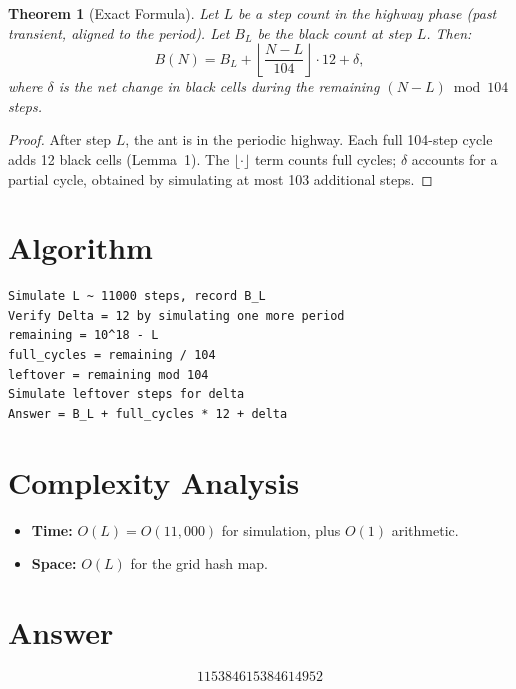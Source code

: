 \documentclass[a4paper,12pt]{article}
\newtheorem{theorem}{Theorem}
\begin{document}
\begin{theorem}[Exact Formula]
Let $L$ be a step count in the highway phase (past transient, aligned to the period). Let $B_L$ be the black count at step $L$. Then:
\[
B(N) = B_L + \left\lfloor \frac{N - L}{104} \right\rfloor \cdot 12 + \delta,
\]
where $\delta$ is the net change in black cells during the remaining $(N - L) \bmod 104$ steps.
\end{theorem}

\begin{proof}
After step $L$, the ant is in the periodic highway. Each full 104-step cycle adds 12 black cells (Lemma~1). The $\lfloor \cdot \rfloor$ term counts full cycles; $\delta$ accounts for a partial cycle, obtained by simulating at most 103 additional steps.
\end{proof}

\section{Algorithm}

\begin{verbatim}
Simulate L ~ 11000 steps, record B_L
Verify Delta = 12 by simulating one more period
remaining = 10^18 - L
full_cycles = remaining / 104
leftover = remaining mod 104
Simulate leftover steps for delta
Answer = B_L + full_cycles * 12 + delta
\end{verbatim}

\section{Complexity Analysis}
\begin{itemize}
    \item \textbf{Time:} $O(L) = O(11{,}000)$ for simulation, plus $O(1)$ arithmetic.
    \item \textbf{Space:} $O(L)$ for the grid hash map.
\end{itemize}

\section{Answer}

\[
\boxed{115384615384614952}
\]
\end{document}

